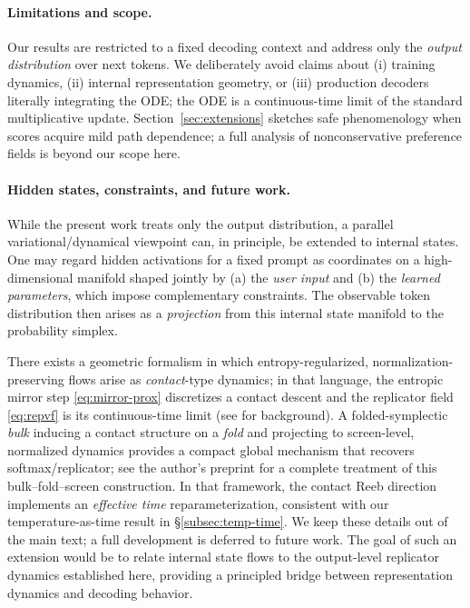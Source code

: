 \documentclass[11pt,reqno]{article}
\numberwithin{equation}{section}
\theoremstyle{plain}
\theoremstyle{definition}
\theoremstyle{remark}
\newcommand{\1}{\mathbbm{1}}
\begin{document}
\paragraph{Limitations and scope.}
Our results are restricted to a fixed decoding context and address only the \emph{output distribution}
over next tokens. We deliberately avoid claims about (i) training dynamics, (ii) internal representation
geometry, or (iii) production decoders literally integrating the ODE; the ODE is a continuous-time limit
of the standard multiplicative update. Section~\ref{sec:extensions} sketches safe phenomenology when
scores acquire mild path dependence; a full analysis of nonconservative preference fields is beyond
our scope here.

\paragraph{Hidden states, constraints, and future work.}
While the present work treats only the output distribution, a parallel variational/dynamical viewpoint
can, in principle, be extended to internal states. One may regard hidden activations for a fixed prompt
as coordinates on a high-dimensional manifold shaped jointly by (a) the \emph{user input} and (b) the
\emph{learned parameters}, which impose complementary constraints. The observable token distribution
then arises as a \emph{projection} from this internal state manifold to the probability simplex. 





There exists a geometric formalism in which entropy-regularized, normalization-preserving flows arise as \emph{contact}-type dynamics; in that language, the entropic mirror step \eqref{eq:mirror-prox} discretizes a contact descent and the replicator field \eqref{eq:repvf} is its continuous-time limit (see \citealp{bravetti2017contact,geiges2008introduction} for background). A folded-symplectic \emph{bulk} inducing a contact structure on a \emph{fold} and projecting to screen-level, normalized dynamics provides a compact global mechanism that recovers softmax/replicator; see the author's preprint \citep{leejenkins2025folded} for a complete treatment of this bulk–fold–screen construction. In that framework, the contact Reeb direction implements an \emph{effective time} reparameterization, consistent with our temperature-as-time result in \S\ref{subsec:temp-time}. We keep these details out of the main text; a full development is deferred to future work. The goal of such an extension would be to relate internal state flows to the output-level
replicator dynamics established here, providing a principled bridge between representation dynamics and
decoding behavior.










\end{document}
